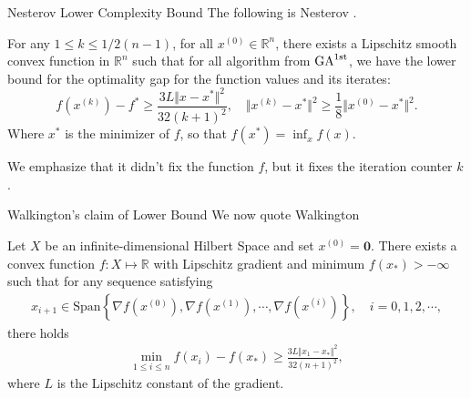 \documentclass[11pt]{beamer}
\theoremstyle{definition}
\begin{document}
    \begin{frame}{Nesterov Lower Complexity Bound}
        The following is Nesterov \cite[Thm 2.1.7]{nesterov_lecture_2018}. 
        \begin{theorem}\label{thm:nesterov_lower_bnd}
            For any $1\le k \le 1/2(n - 1)$, for all $x^{(0)}\in \mathbb R^n$, there exists a Lipschitz smooth convex function in $\mathbb R^n$ such that for all algorithm from $\text{GA}^{\text{1st}}$, we have the lower bound for the optimality gap for the function values and its iterates: 
            \[
                f\left(x^{(k)}\right) - f^* \ge 
                \frac{3L \Vert x - x^*\Vert^2}{32(k + 1)^2}, 
                \quad \Vert x^{(k)} - x^*\Vert^2 \ge \frac{1}{8} \Vert x^{(0)} - x^*\Vert^2.     
            \]
            Where $x^*$ is the minimizer of $f$, so that $f(x^*) = \inf_{x}f(x)$. 
        \end{theorem}
        We emphasize that it didn't fix the function $f$, but it fixes the iteration counter $k$. 
        
    \end{frame}
    \begin{frame}{Walkington's claim of Lower Bound}
        We now quote Walkington \cite[theorem 2.4]{noel_nesterovs_nodate}
        \begin{theorem}
            Let $X$ be an infinite-dimensional Hilbert Space and set $x^{(0)} =\mathbf 0$. There exists a convex function $f: X\mapsto \mathbb R$ with Lipschitz gradient and minimum $f(x_*) > -\infty$ such that for any sequence satisfying 
            \begin{align*}
                x_{i + 1}\in \text{Span}\left\lbrace
                    \nabla f(x^{(0)}), \nabla f(x^{(1)}), \cdots, \nabla f(x^{(i)})
                \right\rbrace, 
                \quad i = 0, 1, 2, \cdots, 
            \end{align*}
            there holds 
            \begin{align*}
                \min_{1\le i \le n}
                f(x_i) - f(x_*) \ge 
                \frac{3L\Vert x_1 - x_*\Vert^2}{32(n + 1)^2}, 
            \end{align*}
            where $L$ is the Lipschitz constant of the gradient. 
        \end{theorem}\label{thm:walkington_lowerbound}
    \end{frame}
\end{document}
